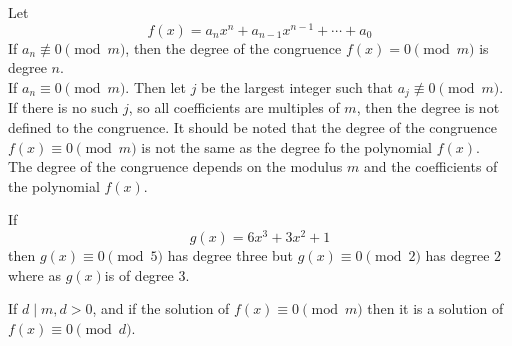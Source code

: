 \documentclass[11pt]{article}
\begin{document}
\begin{definition}\label{Definition 2.5}
    Let \[f(x) = a_{n} x^n + a_{n-1}x^{n - 1} + \cdots + a_0\]
    If \(a_n \not \equiv 0 \pmod{m}\), then the degree of the congruence \(f(x) = 0
    \pmod{m}\) is degree \(n\). \\ If \(a_n \equiv 0 \pmod{m}\). Then let \(j\) be
    the largest integer such that \(a_j \not \equiv 0 \pmod{m}\). \\ If there is no
    such \(j\), so all coefficients are multiples of \(m\), then the degree is not
    defined to the congruence. It should be noted that the degree of the congruence
    \(f(x) \equiv 0 \pmod{m}\) is not the same as the degree fo the polynomial
    \(f(x)\). \\ The degree of the congruence depends on the modulus \(m\) and the
    coefficients of the polynomial \(f(x)\).
\end{definition}

\begin{example}
    If \[g(x)=6x^3 + 3x^2 + 1\] then \(g(x) \equiv 0 \pmod{5}\) has degree three but \(g(x) \equiv 0 \pmod{2}\)
    has degree \(2\) where as \(g(x)\)is of degree \(3\).
\end{example}

\begin{theorem}\label{2.16}
    If \(d \mid m, d > 0\), and if the solution of \(f(x) \equiv 0 \pmod{m}\) then it is a solution of \(f(x) \equiv 0 \pmod{d}\).
\end{theorem}
\end{document}
